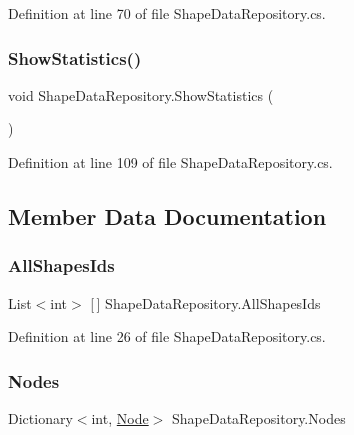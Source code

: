 Definition at line 70 of file Shape\+Data\+Repository.\+cs.

\mbox{\label{class_shape_data_repository_a2c313da2ff206137f70a1999a8970e5f}} 
\subsubsection{\texorpdfstring{ShowStatistics()}{ShowStatistics()}}
{\footnotesize\ttfamily void Shape\+Data\+Repository.\+Show\+Statistics (\begin{DoxyParamCaption}{ }\end{DoxyParamCaption})}



Definition at line 109 of file Shape\+Data\+Repository.\+cs.



\subsection{Member Data Documentation}
\mbox{\label{class_shape_data_repository_a8c56775a61e62f370fae03d64a5ba991}} 
\subsubsection{\texorpdfstring{AllShapesIds}{AllShapesIds}}
{\footnotesize\ttfamily List$<$int$>$ \mbox{[}$\,$\mbox{]} Shape\+Data\+Repository.\+All\+Shapes\+Ids}



Definition at line 26 of file Shape\+Data\+Repository.\+cs.

\mbox{\label{class_shape_data_repository_a619c97595fd858080d11d3c827cda855}} 
\subsubsection{\texorpdfstring{Nodes}{Nodes}}
{\footnotesize\ttfamily Dictionary$<$int, \mbox{\hyperlink{class_node}{Node}}$>$ Shape\+Data\+Repository.\+Nodes}



